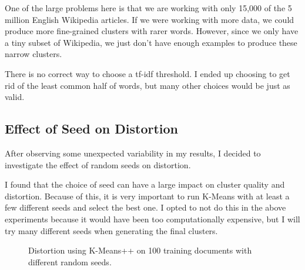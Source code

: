 \documentclass{article} %
\begin{document}
One of the large problems here is that we are working with only 15,000 of the 5 million English Wikipedia articles. If we were working with more data, we could produce more fine-grained clusters with rarer words. However, since we only have a tiny subset of Wikipedia, we just don't have enough examples to produce these narrow clusters.

There is no correct way to choose a tf-idf threshold. I ended up choosing to get rid of the least common half of words, but many other choices would be just as valid.




\subsection{Effect of Seed on Distortion}

After observing some unexpected variability in my results, I decided to investigate the effect of random seeds on distortion.

I found that the choice of seed can have a large impact on cluster quality and distortion. Because of this, it is very important to run K-Means with at least a few different seeds and select the best one. I opted to not do this in the above experiments because it would have been too computationally expensive, but I will try many different seeds when generating the final clusters.

\begin{figure}[h]
\begin{center}
\end{center}
\caption{Distortion using K-Means++ on 100 training documents with different random seeds.}
\end{figure}
\end{document}
